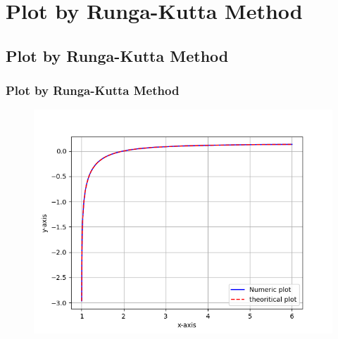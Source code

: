 \documentclass{beamer}
\theoremstyle{remark}
\numberwithin{equation}{section}
\begin{document}
\section{Plot by Runga-Kutta Method}
\subsection{Plot by Runga-Kutta Method}
\begin{frame}
\frametitle{Plot by Runga-Kutta Method}

\begin{figure}[h!]
   \centering
   \includegraphics[width=0.7\linewidth]{figs/Figure_1.png}
   \label{Graph by Runga-Kutta Method}
\end{figure}
   

\end{frame}
\end{document}
